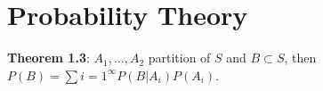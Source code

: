 \section{Probability Theory}
\textbf{Theorem 1.3}: $A_1, ..., A_2$ partition of $S$ and $B\subset S$, then $P(B) = \sum{i=1}^\infty P(B|A_i)P(A_i)$.